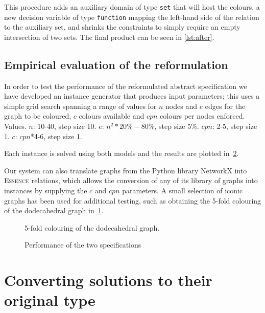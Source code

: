 \documentclass[anonymous,a4paper,UKenglish,cleveref,pdfa]{lipics-v2021}
\newcommand{\essence}{\textsc{Essence}\xspace}
\newcommand{\code}[1]{{\small\texttt{{#1}}}}
\begin{document}
This procedure adds an auxiliary domain of type \code{set} that will host the colours, a new decision variable of type \code{function} mapping the left-hand side of the relation to the auxiliary set, and shrinks the constraints to simply require an empty intersection of two sets. The final product can be seen in \cref{lst:after}.


\subsection{Empirical evaluation of the reformulation}

In order to test the performance of the reformulated abstract specification we have developed an instance generator that produces input parameters; this uses a simple grid search spanning a range of values for $n$ nodes and $e$ edges for the graph to be coloured, $c$ colours available and $cpn$ colours per nodes enforced.
Values. $n$: 10-40, step size 10. $e$: $n^2 *20\%-80\%$, step size 5\%. $cpn$: 2-5, step size 1. $c$: $cpn$*4-6, step size 1.

Each instance is solved using both models and the results are plotted in~\cref{fig:specs_scatter}.

Our system can also translate graphs from the Python library NetworkX into \essence relations, which allows the conversion of any of its library of graphs into instances by supplying the $c$ and $cpn$ parameters. A small selection of iconic graphs has been used for additional testing, such as obtaining the 5-fold colouring of the dodecahedral graph in~\cref{fig:coloured_graph1}.

\begin{figure}
\centering
  
  \caption{5-fold colouring of the dodecahedral graph.}
  \label{fig:coloured_graph1}
\end{figure}

\begin{figure}[htbp]
\centering
  
  \caption{Performance of the two specifications}
  \label{fig:specs_scatter}
\end{figure}

\section{Converting solutions to their original type}
\end{document}
